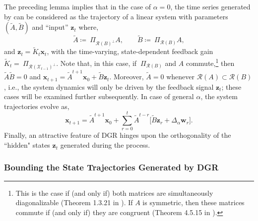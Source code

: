 \documentclass[journal]{IEEEtran}
\theoremstyle{definition}
\theoremstyle{remark}
\newcommand\x{{\bm x}}
\newcommand\z{{\bm z}}
\newcommand\w{{\bm w}}
\begin{document}
	{The preceding lemma implies that in the case of $\alpha = 0$}, the time series generated by  can be considered as the trajectory of a linear system with parameters $(\widetilde{A},\widetilde{B})$ and ``input'' $\z_t$ where,  
	\begin{equation}
    	\label{eqn:DGR-tilde-sys}
    	\widetilde{A} \coloneqq ~\Pi_{\mathcal{R}(B)^\perp} A, \qquad \widetilde{B} \coloneqq ~\Pi_{\mathcal{R}(B)} A,
	\end{equation}
	and $\z_t = \widetilde{K}_t \x_t$, with the {time-varying}, state-dependent feedback gain $\widetilde{K}_t = ~\Pi_{\mathcal{R}(\mathcal{X}_{t-1})^\perp}$.
	{
	Note that, in this case, if $~\Pi_{\mathcal{R}(B)}$ and $A$ commute,\footnote{This is the case if (and only if) both matrices are simultaneously diagonalizable (Theorem 1.3.21 in \cite{horn2012matrix}). If $A$ is symmetric, then these matrices commute if (and only if) they are congruent (Theorem 4.5.15 in \cite{horn2012matrix}).} then $\widetilde{A}\widetilde{B} = 0$ and $\x_{t+1} = \widetilde{A}^{t+1} \x_0 + \widetilde{B} \z_t$.
	Moreover, $\widetilde{A} = 0$ whenever $\mathcal{R}(A) \subset \mathcal{R}(B)$, i.e., the system dynamics will only be driven by the feedback signal $\z_t$; these cases
	will be examined further subsequently.
	In case of general $\alpha$, the system trajectories evolve as,
	\begin{equation}
    	\label{eqn:sys-tilde}
    	\textstyle
    	\x_{t+1} = \widetilde{A}^{t+1} \x_0 + \sum_{r=0}^{t} \widetilde{A}^{t-r} \big[\widetilde{B} \z_r + \Delta_\alpha \w_r\big].
	\end{equation}%
    }%
	Finally, an attractive feature of \ac{DGR} hinges upon the orthogonality
	of the ``hidden" states $\z_t$ generated during the process.

    \subsubsection{Bounding the State Trajectories Generated by DGR}
	\label{subsec:bounds}
	
\end{document}
